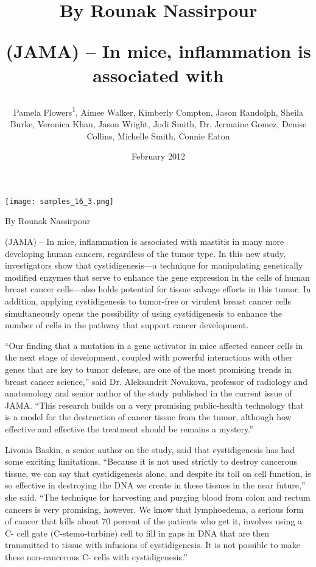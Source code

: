 \documentclass{article}
\title{By Rounak Nassirpour

(JAMA) – In mice, inflammation is associated with}
\author{Pamela Flowers\textsuperscript{1},  Aimee Walker,  Kimberly Compton,  Jason Randolph,  Sheila Burke,  Veronica Khan,  Jason Wright,  Jodi Smith,  Dr. Jermaine Gomez,  Denise Collins,  Michelle Smith,  Connie Eaton}
\affil{\textsuperscript{1}Hong Kong Hospital Authority}
\date{February 2012}
\begin{document}
\maketitle

\begin{center}
\begin{minipage}{0.75\linewidth}
\texttt{[image: samples\_16\_3.png]}
\end{minipage}
\end{center}

By Rounak Nassirpour

(JAMA) – In mice, inflammation is associated with mastitis in many more developing human cancers, regardless of the tumor type. In this new study, investigators show that cystidigenesis—a technique for manipulating genetically modified enzymes that serve to enhance the gene expression in the cells of human breast cancer cells—also holds potential for tissue salvage efforts in this tumor. In addition, applying cystidigenesis to tumor-free or virulent breast cancer cells simultaneously opens the possibility of using cystidigenesis to enhance the number of cells in the pathway that support cancer development.

“Our finding that a mutation in a gene activator in mice affected cancer cells in the next stage of development, coupled with powerful interactions with other genes that are key to tumor defense, are one of the most promising trends in breast cancer science,” said Dr. Aleksandrit Novakova, professor of radiology and anatomology and senior author of the study published in the current issue of JAMA. “This research builds on a very promising public-health technology that is a model for the destruction of cancer tissue from the tumor, although how effective and effective the treatment should be remains a mystery.”

Livonia Baskin, a senior author on the study, said that cystidigenesis has had some exciting limitations. “Because it is not used strictly to destroy cancerous tissue, we can say that cystidigenesis alone, and despite its toll on cell function, is so effective in destroying the DNA we create in these tissues in the near future,” she said. “The technique for harvesting and purging blood from colon and rectum cancers is very promising, however. We know that lymphoedema, a serious form of cancer that kills about 70 percent of the patients who get it, involves using a C- cell gate (C-stemo-turbine) cell to fill in gaps in DNA that are then transmitted to tissue with infusions of cystidigenesis. It is not possible to make these non-cancerous C- cells with cystidigenesis.”
\end{document}
